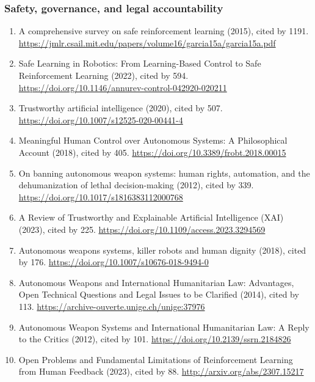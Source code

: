 \documentclass[11pt]{article}
\begin{document}
\hypertarget{safety-governance-and-legal-accountability}{%
\subsubsection{Safety, governance, and legal
accountability}\label{safety-governance-and-legal-accountability}}

\begin{enumerate}
\def\labelenumi{\arabic{enumi}.}
\tightlist
\item
  A comprehensive survey on safe reinforcement learning (2015), cited by
  1191.
  \url{https://jmlr.csail.mit.edu/papers/volume16/garcia15a/garcia15a.pdf}
\item
  Safe Learning in Robotics: From Learning-Based Control to Safe
  Reinforcement Learning (2022), cited by 594.
  \url{https://doi.org/10.1146/annurev-control-042920-020211}
\item
  Trustworthy artificial intelligence (2020), cited by 507.
  \url{https://doi.org/10.1007/s12525-020-00441-4}
\item
  Meaningful Human Control over Autonomous Systems: A Philosophical
  Account (2018), cited by 405.
  \url{https://doi.org/10.3389/frobt.2018.00015}
\item
  On banning autonomous weapon systems: human rights, automation, and
  the dehumanization of lethal decision-making (2012), cited by 339.
  \url{https://doi.org/10.1017/s1816383112000768}
\item
  A Review of Trustworthy and Explainable Artificial Intelligence (XAI)
  (2023), cited by 225.
  \url{https://doi.org/10.1109/access.2023.3294569}
\item
  Autonomous weapons systems, killer robots and human dignity (2018),
  cited by 176. \url{https://doi.org/10.1007/s10676-018-9494-0}
\item
  Autonomous Weapons and International Humanitarian Law: Advantages,
  Open Technical Questions and Legal Issues to be Clarified (2014),
  cited by 113. \url{https://archive-ouverte.unige.ch/unige:37976}
\item
  Autonomous Weapon Systems and International Humanitarian Law: A Reply
  to the Critics (2012), cited by 101.
  \url{https://doi.org/10.2139/ssrn.2184826}
\item
  Open Problems and Fundamental Limitations of Reinforcement Learning
  from Human Feedback (2023), cited by 88.
  \url{http://arxiv.org/abs/2307.15217}
\end{enumerate}
\end{document}
